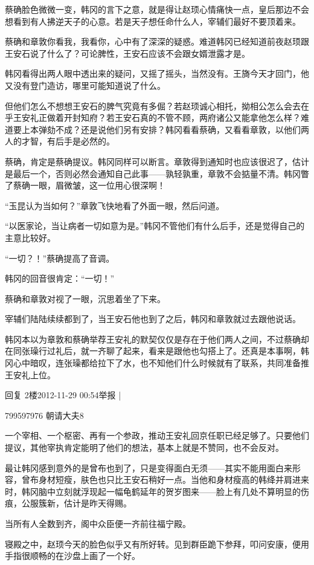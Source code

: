 蔡确脸色微微一变，韩冈的言下之意，就是得让赵顼心情痛快一点，皇后那边不会想看到有人拂逆天子的心意。若是天子想任命什么人，宰辅们最好不要顶着来。

蔡确和章敦你看我，我看你，心中有了深深的疑惑。难道韩冈已经知道前夜赵顼跟王安石说了什么了？可论脾性，王安石应该不会跟女婿泄露才是。

韩冈看得出两人眼中透出来的疑问，又摇了摇头，当然没有。王旖今天才回门，他又没有登门造访，哪里可能知道说了什么。

但他们怎么不想想王安石的脾气究竟有多倔？若赵顼诚心相托，拗相公怎么会去在乎王安礼正做着开封知府？若王安石真的不管不顾，两府诸公又能拿他怎么样？难道要上本弹劾不成？还是说他们另有安排？韩冈看看蔡确，又看看章敦，以他们两人的才智，有后手是必然的。

蔡确，肯定是蔡确提议。韩冈同样可以断言。章敦得到通知时也应该很迟了，估计是最后一个，否则必然会通知自己此事——孰轻孰重，章敦不会掂量不清。韩冈瞥了蔡确一眼，眉微皱，这一位用心很深啊！

“玉昆认为当如何？”章敦飞快地看了外面一眼，然后问道。

“以医家论，当让病者一切如意为是。”韩冈不管他们有什么后手，还是觉得自己的主意比较好。

“一切？！”蔡确提高了音调。

韩冈的回音很肯定：“一切！”

蔡确和章敦对视了一眼，沉思着坐了下来。

宰辅们陆陆续续都到了，当王安石他也到了之后，韩冈和章敦就过去跟他说话。

韩冈本以为章敦和蔡确举荐王安礼的默契仅仅是存在于他们两人之间，不过蔡确却在同张璪行过礼后，就一齐聊了起来，看来是跟他也勾搭上了。还真是本事啊，韩冈心中暗叹，连张璪都给拉下了水，也不知他们什么时候就有了联系，共同准备推王安礼上位。

回复 2楼2012-11-29 00:54举报 |

799597976
朝请大夫8

一个宰相、一个枢密、再有一个参政，推动王安礼回京任职已经足够了。只要他们提议，其他宰执肯定能明了他们的想法，基本上就是不赞同，也不会反对。

最让韩冈感到意外的是曾布也到了，只是变得面白无须——其实不能用面白来形容，曾布身材短瘦，肤色也只比王安石稍好一点。当他和身材瘦高的韩绛并肩进来时，韩冈脑中立刻就浮现起一幅龟鹤延年的贺岁图来——脸上有几处不算明显的伤痕，公服簇新，估计是昨天得赐。

当所有人全数到齐，阁中众臣便一齐前往福宁殿。

寝殿之中，赵顼今天的脸色似乎又有所好转。见到群臣跪下参拜，叩问安康，便用手指很顺畅的在沙盘上画了一个好。

